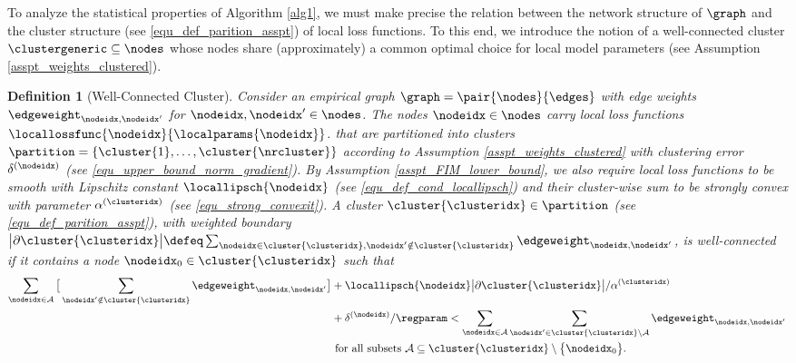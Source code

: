 \documentclass[lettersize,journal]{IEEEtran}
\newcommand\strongconvparam[1]{\alpha^{(#1)}}
\newcommand\clusteropterr[1]{\delta^{(#1)}}
\newtheorem{definition}[theorem]{Definition}
\begin{document}
To analyze the statistical properties of Algorithm \ref{alg1}, we must make precise 
the relation between the network structure of $\graph$ and the cluster structure (see \eqref{equ_def_parition_asspt}) 
of local loss functions. To this end, we introduce the notion of a well-connected cluster $\clustergeneric  \subseteq \nodes$ 
whose nodes share (approximately) a common optimal choice for local model parameters (see Assumption \ref{asspt_weights_clustered}).  
\begin{definition}[Well-Connected Cluster] 
\label{equ_def_well_connected_cluster}
Consider an empirical graph $\graph=\pair{\nodes}{\edges}$ with edge weights $\edgeweight_{\nodeidx,\nodeidx'}$ 
for $\nodeidx,\nodeidx' \in \nodes$. The nodes $\nodeidx \in \nodes$ carry local loss functions $\locallossfunc{\nodeidx}{\localparams{\nodeidx}}$. 
that are partitioned into clusters $\partition = \{\cluster{1},\ldots,\cluster{\nrcluster}\}$ according to Assumption \ref{asspt_weights_clustered} 
with clustering error $\clusteropterr{\nodeidx}$ (see \eqref{equ_upper_bound_norm_gradient}). By Assumption \ref{asspt_FIM_lower_bound}, 
we also require local loss functions to be smooth with Lipschitz constant $\locallipsch{\nodeidx}$ (see \eqref{equ_def_cond_locallipsch}) 
and their cluster-wise sum to be strongly convex with parameter $\strongconvparam{\clusteridx}$ (see \eqref{equ_strong_convexit}). 
A cluster $\cluster{\clusteridx} \in \partition$ (see \eqref{equ_def_parition_asspt}), 
with weighted boundary $\big| \partial \cluster{\clusteridx} \big| \defeq \sum_{\nodeidx \in \cluster{\clusteridx}, \nodeidx' \notin \cluster{\clusteridx}} \edgeweight_{\nodeidx,\nodeidx'}$, is well-connected if it contains a node $\nodeidx_{0} \in \cluster{\clusteridx}$ such that 
\begin{equation} 
\label{equ_def_well_connected_condition}
\begin{aligned}
     \sum_{\nodeidx \in \mathcal{A}}  \big[ \sum_{\nodeidx' \notin \cluster{\clusteridx}} \edgeweight_{\nodeidx,\nodeidx'} \big] & + \locallipsch{\nodeidx} \big| \partial  \cluster{\clusteridx} \big | /\strongconvparam{\clusteridx} \\ 
     & + \clusteropterr{\nodeidx}/\regparam  < \sum_{\nodeidx \in \mathcal{A}}  \sum_{\nodeidx' \in \cluster{\clusteridx} \setminus \mathcal{A} }
 \edgeweight_{\nodeidx,\nodeidx'} \\
 & \mbox{ for all subsets } \mathcal{A} \subseteq \cluster{\clusteridx} \setminus \big\{ \nodeidx_{0} \big\}. 
\end{aligned}
\vspace{-2mm}
\end{equation} 
\end{definition}
\end{document}
